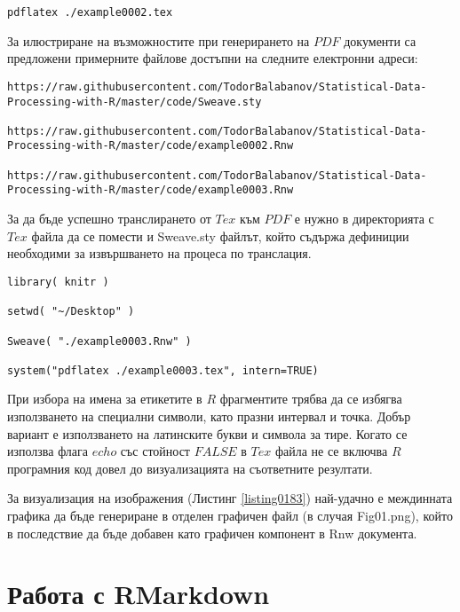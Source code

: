 \begin{lstlisting}[caption=Транслиране от Tex до PDF, label=listing0181]
pdflatex ./example0002.tex
\end{lstlisting}

За илюстриране на възможностите при генерирането на $PDF$ документи са предложени примерните файлове достъпни на следните електронни адреси:

\begin{lstlisting}[caption=Адрес на примерени $LaTeX$ документи, label=listing0182]
https://raw.githubusercontent.com/TodorBalabanov/Statistical-Data-Processing-with-R/master/code/Sweave.sty

https://raw.githubusercontent.com/TodorBalabanov/Statistical-Data-Processing-with-R/master/code/example0002.Rnw

https://raw.githubusercontent.com/TodorBalabanov/Statistical-Data-Processing-with-R/master/code/example0003.Rnw
\end{lstlisting}

За да бъде успешно транслирането от $Tex$ към $PDF$ е нужно в директорията с $Tex$ файла да се помести и Sweave.sty файлът, който съдържа дефиниции необходими за извършването на процеса по транслация. 

\begin{lstlisting}[caption=Линейна регресия на разходи спрямо спестявания, label=listing0183]
library( knitr )

setwd( "~/Desktop" )

Sweave( "./example0003.Rnw" )

system("pdflatex ./example0003.tex", intern=TRUE)
\end{lstlisting}

При избора на имена за етикетите в $R$ фрагментите трябва да се избягва използването на специални символи, като празни интервал и точка. Добър вариант е използването на латинските букви и символа за тире. Когато се използва флага $echo$ със стойност $FALSE$ в $Tex$ файла не се включва $R$ програмния код довел до визуализацията на съответните резултати. 

За визуализация на изображения (Листинг \ref{listing0183}) най-удачно е междинната графика да бъде генериране в отделен графичен файл (в случая Fig01.png), който в последствие да бъде добавен като графичен компонент в Rnw документа.

\section{Работа с RMarkdown}

